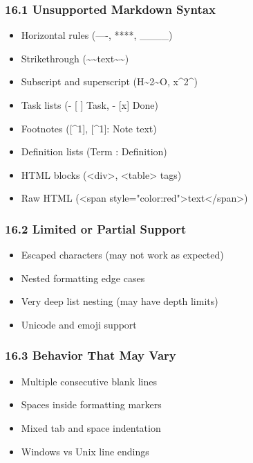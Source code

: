 \documentclass{article}
\begin{document}
\subsubsection{ 16.1 Unsupported Markdown Syntax}

\begin{itemize}
\item  Horizontal rules (----, ****, \_\_\_\_)
\item  Strikethrough (\~{}\~{}text\~{}\~{})
\item  Subscript and superscript (H\~{}2\~{}O, x\^{}2\^{})
\item  Task lists (- [ ] Task, - [x] Done)
\item  Footnotes ([\^{}1], [\^{}1]: Note text)
\item  Definition lists (Term : Definition)
\item  HTML blocks (<div>, <table> tags)
\item  Raw HTML (<span style="color:red">text</span>)
\end{itemize}

\subsubsection{ 16.2 Limited or Partial Support}

\begin{itemize}
\item  Escaped characters (may not work as expected)
\item  Nested formatting edge cases
\item  Very deep list nesting (may have depth limits)
\item  Unicode and emoji support
\end{itemize}

\subsubsection{ 16.3 Behavior That May Vary}

\begin{itemize}
\item  Multiple consecutive blank lines
\item  Spaces inside formatting markers
\item  Mixed tab and space indentation
\item  Windows vs Unix line endings
\end{itemize}

\noindent\hrulefill
\end{document}

